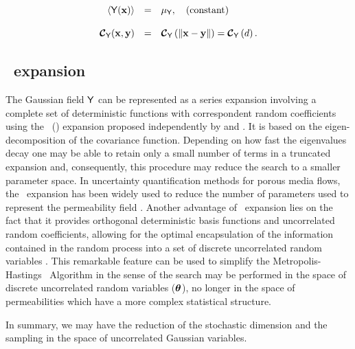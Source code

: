 \begin{equation}
 \begin{array}{rcl}
    \langle {\mathsf{Y}\!\left(\mathbf{x}\right)} \rangle &=& {\mu_{\mathsf{Y}}},\quad \mbox{(constant)}\\ \\
    {\boldmath{\mbox{$\mathcal{C}$}}}_{\mathsf{Y}}(\mathbf{x}, \mathbf{y})   &=& {\boldmath{\mbox{$\mathcal{C}$}}}_{\mathsf{Y}}\left(\lVert \mathbf{x} - \mathbf{y} \rVert \right) = {\boldmath{\mbox{$\mathcal{C}$}}}_{\mathsf{Y}}\left(d\right).
 \end{array}
\end{equation}



\subsection{\KL\ expansion}

The Gaussian field $\mathsf{Y}$ can be represented as a series expansion involving a complete set of deterministic functions with correspondent random coefficients using the \KL\ (\kl) expansion proposed independently by \cite{karhunen46} and \cite{loeve55}.
It is based on the eigen-decomposition of the covariance function.
Depending on how fast the eigenvalues decay one may be able to  retain only a small number of terms in a truncated expansion and, consequently, this procedure may reduce the search to a smaller parameter space.
In uncertainty quantification methods for porous media flows, the \kl\ expansion has been widely used to reduce the number of parameters used to represent the permeability field \citep{efendiev05,efendiev2006,das10,mondal10,ginting11,ginting12}.
Another advantage of \kl\ expansion lies on the fact that it provides orthogonal deterministic basis functions and uncorrelated random coefficients, allowing for the optimal encapsulation of the information contained in the random process into a set of discrete uncorrelated random variables \citep{GhanemSpanos}.
This remarkable feature can be used to simplify the Metropolis-Hastings \mcmc\ Algorithm in the sense of the search may be performed in the space of discrete uncorrelated random variables ($\boldsymbol{\theta}$), no longer in the space of permeabilities which have a more complex statistical structure.

In summary, we may have the reduction of the stochastic dimension and the sampling in the space of uncorrelated Gaussian variables.
